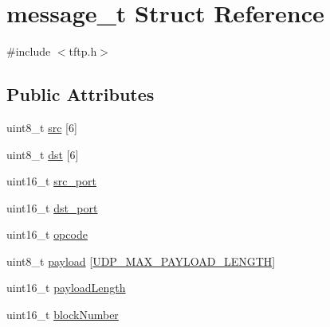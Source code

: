 \hypertarget{structmessage__t}{\section{message\-\_\-t \-Struct \-Reference}
\label{structmessage__t}
}


{\ttfamily \#include $<$tftp.\-h$>$}

\subsection*{\-Public \-Attributes}
\begin{DoxyCompactItemize}
\item 
uint8\-\_\-t \hyperlink{structmessage__t_ac8f22051bbe97a235c19698e9705c362}{src} \mbox{[}6\mbox{]}
\item 
uint8\-\_\-t \hyperlink{structmessage__t_a1e6460e4025568b22c19e9fa4635ff9f}{dst} \mbox{[}6\mbox{]}
\item 
uint16\-\_\-t \hyperlink{structmessage__t_ae11b6a0645157c8c75790f7c541fcaed}{src\-\_\-port}
\item 
uint16\-\_\-t \hyperlink{structmessage__t_ac1b5eec32a146d37d429552a7f3f7775}{dst\-\_\-port}
\item 
uint16\-\_\-t \hyperlink{structmessage__t_ae51f52a1afc73e1479579e83a7ca3728}{opcode}
\item 
uint8\-\_\-t \hyperlink{structmessage__t_a6ad8b21c0bc600519e376f7832e538af}{payload} \mbox{[}\hyperlink{udp__ip_8h_af4316ac3775e3125bab44d448a57603e}{\-U\-D\-P\-\_\-\-M\-A\-X\-\_\-\-P\-A\-Y\-L\-O\-A\-D\-\_\-\-L\-E\-N\-G\-T\-H}\mbox{]}
\item 
uint16\-\_\-t \hyperlink{structmessage__t_ac49e1df59afca01e0f2cef436ef00359}{payload\-Length}
\item 
uint16\-\_\-t \hyperlink{structmessage__t_ab2e0dd1f90b17e739a3ddbb7b2676318}{block\-Number}
\end{DoxyCompactItemize}


